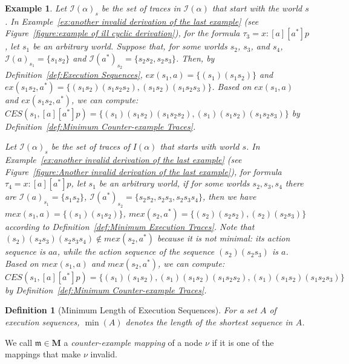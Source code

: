 \documentclass[manuscript,screen]{acmart}
\newtheorem{definition}{Definition}[section]
\newtheorem{example}{Example}[section]
\newcommand{\bff}[1]{\mathbf{#1}}
\newcommand{\mcl}[1]{\mathcal{#1}}
\newcommand{\mfr}[1]{\mathfrak{#1}}
\newcommand{\lm}[0]{\mfr{m}}
\newcommand{\EX}[0]{\textit{CES}}
\newcommand{\ex}[0]{\textit{ex}}
\newcommand{\mex}[0]{\textit{mex}}
\newcommand{\I}[0]{\mcl{I}}
\newcommand{\LM}[0]{\bff{M}}
\begin{document}
\begin{example}
    \label{ex:CT and MCT}
 Let $\I(\alpha)_s$ be the set of traces in $\I(\alpha)$ that start with the world $s$. 
In Example~\ref{ex:another invalid derivation of the last example} (see Figure~\ref{figure:example of ill cyclic derivation}), for the formula $\tau_3 = x : [a][a^*]p$, let $s_1$ be an arbitrary world. Suppose that, for some worlds $s_2$, $s_3$, and $s_4$, $\I(a)_{s_1} = \{s_1s_2\}$ and $\I(a^*)_{s_2}=\{s_2s_2, s_2s_3\}$. Then, by Definition~\ref{def:Execution Sequences}, $\ex(s_1, a) = \{(s_1)(s_1s_2)\}$ and $\ex(s_1s_2, a^*)=\{(s_1s_2)(s_1s_2s_2), (s_1s_2)(s_1s_2s_3)\}$. 
Based on $\ex(s_1, a)$ and $\ex(s_1s_2, a^*)$, we can compute: $\EX(s_1, [a][a^*]p) = \{(s_1)(s_1s_2)(s_1s_2s_2), (s_1)(s_1s_2)(s_1s_2s_3)\}$ by Definition~\ref{def:Minimum Counter-example Traces}.   

\ifx
Let $\I(\alpha)_s$ be the set of traces of $I(\alpha)$ that starts with world $s$. 
In Example~\ref{ex:another invalid derivation of the last example} (see Figure~\ref{figure:Another invalid derivation of the last example}), for formula $\tau_4 = x : [a][a^*]p$, let $s_1$ be an arbitrary world, if for some worlds $s_2,s_3,s_4$ there are $\I(a)_{s_1} = \{s_1s_2\}$, $\I(a^*)_{s_2}=\{s_2s_2, s_2s_3, s_2s_3s_4\}$, then we have $\mex(s_1, a) = \{(s_1)(s_1s_2)\}$, $\mex(s_2, a^*)=\{(s_2)(s_2s_2), (s_2)(s_2s_3)\}$ according to Definition~\ref{def:Minimum Execution Traces}. Note that $(s_2)(s_2s_3)(s_2s_3s_4)\notin \mex(s_2,a^*)$ because it is not minimal: its action sequence is $aa$, while the action sequence of the sequence $(s_2)(s_2s_3)$ is $a$. 
Based on $\mex(s_1, a)$ and $\mex(s_2, a^*)$, we can compute: $\EX(s_1, [a][a^*]p) = \{(s_1)(s_1s_2), (s_1)(s_1s_2)(s_1s_2s_2), (s_1)(s_1s_2)(s_1s_2s_3)\}$ by Definition~\ref{def:Minimum Counter-example Traces}.   
\fi
\end{example}

\begin{definition}[Minimum Length of Execution Sequences]
For a set $A$ of execution sequences, $\min(A)$ denotes the length of the shortest sequence in $A$. 
\end{definition}

We call $\lm\in \LM$ a \emph{counter-example mapping} of a node $\nu$ if it is one of the mappings that make $\nu$ invalid. 
\end{document}

